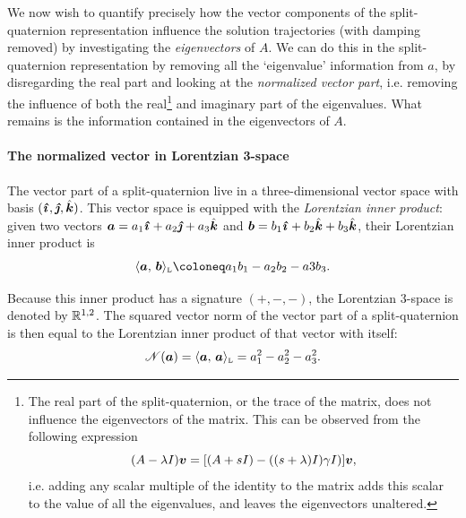 We now wish to quantify precisely how the vector components of the split-quaternion representation influence the solution trajectories (with damping removed) by investigating the \emph{eigenvectors} of \(A\). We can do this in the split-quaternion representation by removing all the `eigenvalue' information from \(a\), by disregarding the real part and looking at the \emph{normalized vector part}, i.e. removing the influence of both the real\footnote
{
The real part of the split-quaternion, or the trace of the matrix, does not influence the eigenvectors of the matrix. This can be observed from the following expression
\begin{equation}
     (A - \lambda I)\vec{v} = \qty[(A + s I) - ((s + \lambda) I) \gamma I)]\vec{v},
\end{equation}
i.e. adding any scalar multiple of the identity to the matrix adds this scalar to the value of all the eigenvalues, and leaves the eigenvectors unaltered.
}
and imaginary part of the eigenvalues. What remains is the information contained in the eigenvectors of \(A\).

\paragraph{The normalized vector in Lorentzian 3-space} The vector part of a split-quaternion live in a three-dimensional vector space with basis \((\quati, \quatj, \quatk)\). This vector space is equipped with the \emph{Lorentzian inner product}: given two vectors \(\vec{a} = a_1\quati + a_2\quatj + a_3\quatk\) and \(\vec{b}= b_1\quati + b_2\quatk + b_3\quatk\), their Lorentzian inner product is
\begin{equation}
     \lorinner{\vec{a}}{\vec{b}} \coloneq a_1b_1 - a_2b_2 - a3b_3.
\end{equation}

Because this inner product has a signature \((+,-,-)\), the Lorentzian 3-space is denoted by \(\mathbb{R}^{1, 2}\). The squared vector norm of the vector part of a split-quaternion is then equal to the Lorentzian inner product of that vector with itself:
\begin{equation}
     \mathscr{N}(\vec{a}) = \lorinner{\vec{a}}{\vec{a}} = a_1^2 - a_2^2 - a_3^2.
\end{equation}

